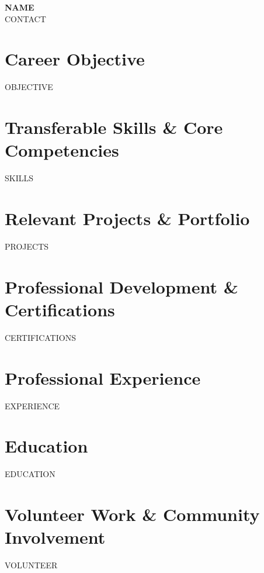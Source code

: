 \documentclass[letterpaper,11pt]{article}
\newcommand{\resumeSubHeadingListStart}{\begin{itemize}[leftmargin=*]}
\newcommand{\resumeSubHeadingListEnd}{\end{itemize}}
\begin{document}
\begin{center}
  \textbf{\Large {{NAME}}} \\ \vspace{1pt}
  \small {{CONTACT}}
\end{center}

\section{Career Objective}
\small{{{OBJECTIVE}}}

\section{Transferable Skills \& Core Competencies}
\begin{itemize}[leftmargin=0.15in, label={}]
  \small{\item{
{{SKILLS}}
  }}
\end{itemize}

\section{Relevant Projects \& Portfolio}
  \resumeSubHeadingListStart
{{PROJECTS}}
  \resumeSubHeadingListEnd

\section{Professional Development \& Certifications}
  \resumeSubHeadingListStart
{{CERTIFICATIONS}}
  \resumeSubHeadingListEnd

\section{Professional Experience}
  \resumeSubHeadingListStart
{{EXPERIENCE}}
  \resumeSubHeadingListEnd

\section{Education}
  \resumeSubHeadingListStart
{{EDUCATION}}
  \resumeSubHeadingListEnd

\section{Volunteer Work \& Community Involvement}
  \resumeSubHeadingListStart
{{VOLUNTEER}}
  \resumeSubHeadingListEnd
\end{document}
